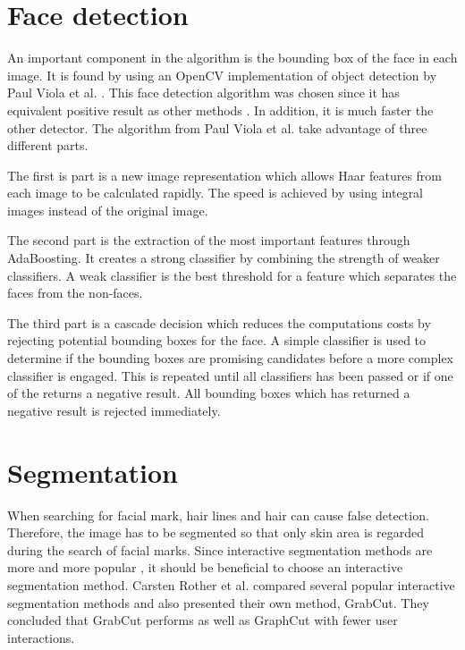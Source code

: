 \section{Face detection}

An important component in the algorithm is the bounding box of the face in each image. It is found by using an OpenCV \cite{opencv} implementation of object detection by Paul Viola et al. \cite{face_detection}. This face detection algorithm was chosen since it has equivalent positive result as other methods \cite{face_detecion_comp,face_detecion_comp_2}. In addition, it is much faster the other detector. The algorithm from Paul Viola et al. take advantage of three different parts. 

The first is part is a new image representation which allows Haar features from each image to be calculated rapidly. The speed is achieved by using integral images instead of the original image. 

The second part is the extraction of the most important features through AdaBoosting. It creates a strong classifier by combining the strength of weaker classifiers. A weak classifier is the best threshold for a feature which separates the faces from the non-faces.

The third part is a cascade decision which reduces the computations costs by rejecting potential bounding boxes for the face. A simple classifier is used to determine if the bounding boxes are promising candidates before a more complex classifier is engaged. This is repeated until all classifiers has been passed or if one of the returns a negative result. All bounding boxes which has returned a negative result is rejected immediately.  

\section{Segmentation} \label{sec:segmentation} 

When searching for facial mark, hair lines and hair can cause false detection. Therefore, the image has to be segmented so that only skin area is regarded during the search of facial marks. Since interactive segmentation methods are more and more popular \cite{graphcut}, it should be beneficial to choose an interactive segmentation method. Carsten Rother et al.\cite{grabcut} compared several popular interactive segmentation methods and also presented their own method, GrabCut. They concluded that GrabCut performs as well as GraphCut \cite{graphcut} with fewer user interactions.

